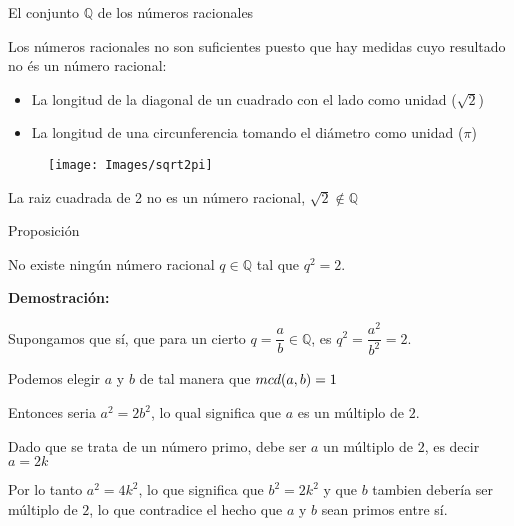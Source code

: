 \documentclass[
  ignorenonframetext,
]{beamer}
\providecommand{\tightlist}{%
  \setlength{\itemsep}{0pt}\setlength{\parskip}{0pt}}
\begin{document}
\begin{frame}{El conjunto \(\mathbb{Q}\) de los números racionales}
\protect\hypertarget{el-conjunto-mathbbq-de-los-nuxfameros-racionales-1}{}

Los números racionales no son suficientes puesto que hay medidas cuyo
resultado no és un número racional:

\begin{itemize}
\tightlist
\item
  La longitud de la diagonal de un cuadrado con el lado como unidad
  (\(\sqrt{2}\))
\item
  La longitud de una circunferencia tomando el diámetro como unidad
  (\(\pi\))
\end{itemize}

\begin{figure}
\texttt{[image: Images/sqrt2pi]} \end{figure}

\end{frame}

\begin{frame}{La raiz cuadrada de 2 no es un número racional,
\(\sqrt{2} \notin \mathbb{Q}\)}
\protect\hypertarget{la-raiz-cuadrada-de-2-no-es-un-nuxfamero-racional-sqrt2-notin-mathbbq}{}

Proposición

No existe ningún número racional \(q \in \mathbb{Q}\) tal que \(q^2=2\).

\textbf{Demostración:}

Supongamos que sí, que para un cierto
\(q =\dfrac{a}{b} \in \mathbb{Q}\), es \(q^2=\dfrac{a^2}{b^2} = 2\).

Podemos elegir \(a\) y \(b\) de tal manera que \(\\mcd(a,b)=1\)

Entonces seria \(a^2=2b^2\), lo qual significa que \(a\) es un múltiplo
de \(2\).

Dado que se trata de un número primo, debe ser \(a\) un múltiplo de
\(2\), es decir \(a=2k\)

Por lo tanto \(a^2 = 4k^2\), lo que significa que \(b^2=2k^2\) y que
\(b\) tambien debería ser múltiplo de \(2\), lo que contradice el hecho
que \(a\) y \(b\) sean primos entre sí.

\end{frame}
\end{document}
